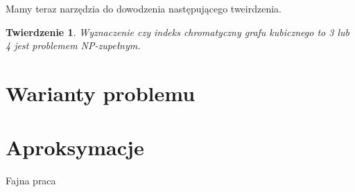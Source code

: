 \documentclass[12pt]{article}
\newtheorem{theorem}{Twierdzenie}
\begin{document}
Mamy teraz narzędzia do dowodzenia następującego tweirdzenia.

\begin{theorem}
    Wyznaczenie czy indeks chromatyczny grafu kubicznego to 3 lub 4 jest problemem NP-zupełnym.
\end{theorem}



\section{Warianty problemu}

\section{Aproksymacje}

Fajna praca~\cite{Nakano1995}



\end{document}
